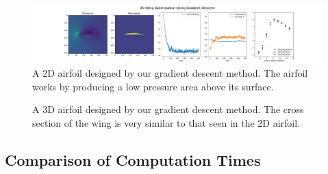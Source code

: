 \documentclass{article} %
\begin{document}
\begin{figure}[h]
\begin{center}
\includegraphics[scale=0.25]{../test/figs/learn_gradient_descent.pdf}
\end{center}
\caption{A 2D airfoil designed by our gradient descent method. The airfoil works by producing a low pressure area above its surface.}
\label{learn_gradient_descent}
\end{figure}


\begin{figure}[h]
\begin{center}
\end{center}
\caption{A 3D airfoil designed by our gradient descent method. The cross section of the wing is very similar to that seen in the 2D airfoil.}
\label{learn_gradient_descent_3d}
\end{figure}

\subsection{Comparison of Computation Times}
\end{document}
